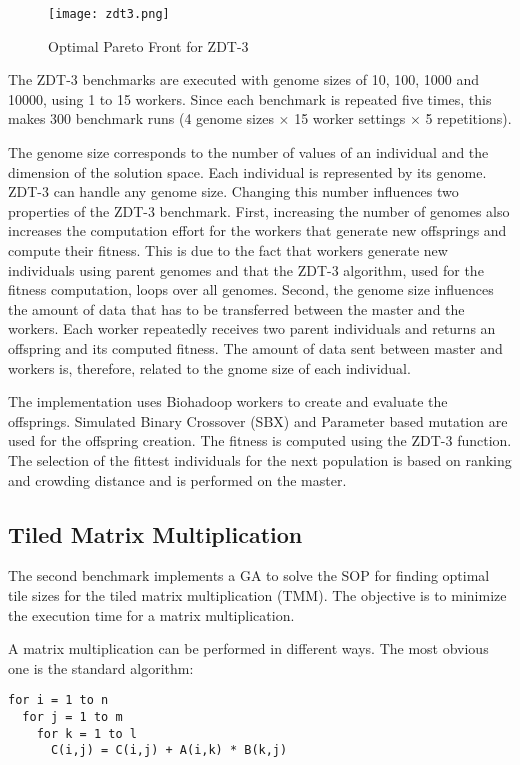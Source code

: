 \begin{figure}
  \centering
  \texttt{[image: zdt3.png]}
  \caption[Optimal Pareto Front for ZDT-3]{Optimal Pareto Front for ZDT-3}
  \label{fig:zdt3}
\end{figure}

The ZDT-3 benchmarks are executed with genome sizes of 10, 100, 1000 and 10000, using 1 to 15 workers. Since each benchmark is repeated five times, this makes 300 benchmark runs (4 genome sizes $\times$ 15 worker settings $\times$ 5 repetitions).

The genome size corresponds to the number of values of an individual and the dimension of the solution space. Each individual is represented by its genome. ZDT-3 can handle any genome size. Changing this number influences two properties of the ZDT-3 benchmark. First, increasing the number of genomes also increases the computation effort for the workers that generate new offsprings and compute their fitness. This is due to the fact that workers generate new individuals using parent genomes and that the ZDT-3 algorithm, used for the fitness computation, loops over all genomes. Second, the genome size influences the amount of data that has to be transferred between the master and the workers. Each worker repeatedly receives two parent individuals and returns an offspring and its computed fitness. The amount of data sent between master and workers is, therefore, related to the gnome size of each individual.

The implementation uses Biohadoop workers to create and evaluate the offsprings. Simulated Binary Crossover (SBX) and Parameter based mutation \cite{deb2000efficient} are used for the offspring creation. The fitness is computed using the ZDT-3 function. The selection of the fittest individuals for the next population is based on ranking and crowding distance and is performed on the master.

\subsection{Tiled Matrix Multiplication}
\label{chap:evaluation:tiledmul}
The second benchmark implements a GA to solve the SOP for finding optimal tile sizes for the tiled matrix multiplication (TMM). The objective is to minimize the execution time for a matrix multiplication.

A matrix multiplication can be performed in different ways. The most obvious one is the standard algorithm:
\begin{lstlisting}
for i = 1 to n
  for j = 1 to m
    for k = 1 to l
      C(i,j) = C(i,j) + A(i,k) * B(k,j)
\end{lstlisting}

